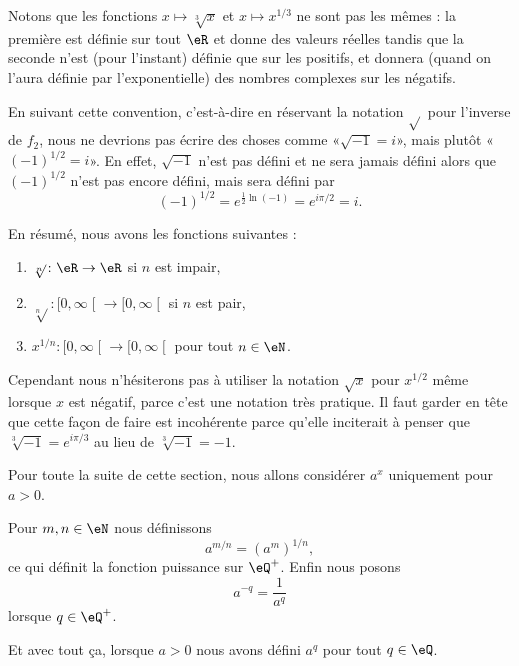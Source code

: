 \begin{normaltext}      \label{NORMooYPRNooWCjEgR}
    Notons que les fonctions \( x\mapsto \sqrt[3]{ x }\) et \( x\mapsto x^{1/3}\) ne sont pas les mêmes : la première est définie sur tout \( \eR\) et donne des valeurs réelles tandis que la seconde n'est (pour l'instant) définie que sur les positifs, et donnera (quand on l'aura définie par l'exponentielle) des nombres complexes sur les négatifs.

    En suivant cette convention, c'est-à-dire en réservant la notation \( \sqrt{  }\) pour l'inverse de \( f_2\), nous ne devrions pas écrire des choses comme «\( \sqrt{ -1 }=i\)», mais plutôt «\( (-1)^{1/2}=i \)». En effet, \( \sqrt{ -1 }\) n'est pas défini et ne sera jamais défini alors que \( (-1)^{1/2}\) n'est pas encore défini, mais sera défini par 
    \begin{equation}
        (-1)^{1/2}= e^{\frac{ 1 }{2}\ln(-1)}= e^{i\pi/2}=i.
    \end{equation}
\end{normaltext}

En résumé, nous avons les fonctions suivantes :
\begin{enumerate}
    \item
        \( \sqrt[n]{  }\colon \eR\to \eR\) si \( n\) est impair,
    \item
        \( \sqrt[n]{  }\colon \mathopen[ 0 , \infty \mathclose[\to \mathopen[ 0 , \infty \mathclose[ \) si \( n\) est pair,
    \item
        \( x^{1/n}\colon \mathopen[ 0 , \infty \mathclose[\to \mathopen[ 0 , \infty \mathclose[\) pour tout \( n\in \eN\).
\end{enumerate}
Cependant nous n'hésiterons pas à utiliser la notation \( \sqrt{ x }\) pour \( x^{1/2}\) même lorsque \( x\) est négatif, parce c'est une notation très pratique. Il faut garder en tête que cette façon de faire est incohérente parce qu'elle inciterait à penser que \( \sqrt[3]{-1  }= e^{i\pi/3}\) au lieu de \( \sqrt[3]{-1  }=-1\).

Pour toute la suite de cette section, nous allons considérer \( a^x\) uniquement pour \( a>0\).

\begin{definition}
    Pour \( m,n\in \eN\) nous définissons 
    \begin{equation}        \label{EQooZFOAooTsMbub}
        a^{m/n}=(a^m)^{1/n},
    \end{equation}
    ce qui définit la fonction puissance sur \( \eQ^+\). Enfin nous posons
    \begin{equation}        \label{DEFooTUCVooXikxRh}
        a^{-q}=\frac{1}{ a^q }
    \end{equation}
    lorsque \( q\in \eQ^+\).

    Et avec tout ça, lorsque \( a>0\) nous avons défini \( a^q\) pour tout \( q\in \eQ\).
\end{definition}

